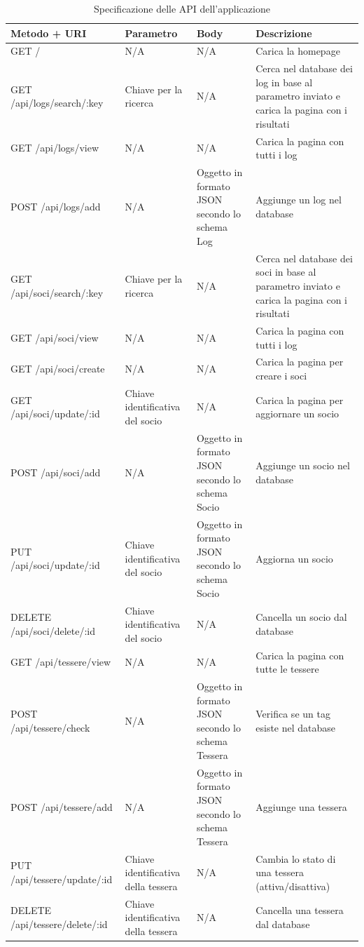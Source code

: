 \documentclass[12pt]{report}
\begin{document}
\vspace*{35px} 
\begin{table}[H]
	\scriptsize
	\centering
	\def\tabularxcolumn#1{m{#1}}
	\renewcommand\arraystretch{1.8}
	\renewcommand\tabcolsep{3.0pt}
	\begin{tabularx}{\textwidth}{|L|L|L|L|}
		\hline
		\textbf{Metodo + URI} & \textbf{Parametro} & \textbf{Body} & \textbf{Descrizione} \\
		\hline                              
		GET / & N/A & N/A & Carica la homepage \\ 
		\hline
		GET /api/logs/search/:key & Chiave per la ricerca & N/A 
		& Cerca nel database dei log in base al parametro inviato e carica la pagina con i risultati \\
		\hline
		GET /api/logs/view & N/A & N/A & Carica la pagina con tutti i log \\
		\hline  
		POST /api/logs/add & N/A & Oggetto in formato JSON secondo lo schema Log & Aggiunge un log nel database \\
		\hline
		GET /api/soci/search/:key & Chiave per la ricerca & N/A & Cerca nel database dei soci in base al parametro inviato e carica la pagina con i risultati \\ 
		\hline
		GET /api/soci/view & N/A & N/A & Carica la pagina con tutti i log \\ 
		\hline
		GET /api/soci/create & N/A & N/A & Carica la pagina per creare i soci \\ 
		\hline
		GET /api/soci/update/:id & Chiave identificativa del socio & N/A & Carica la pagina per aggiornare un socio \\ 
		\hline
		POST /api/soci/add & N/A & Oggetto in formato JSON secondo lo schema Socio & Aggiunge un socio nel database \\ 
		\hline
		PUT /api/soci/update/:id & Chiave identificativa del socio & Oggetto in formato JSON secondo lo schema Socio & Aggiorna un socio \\ 
		\hline
		DELETE /api/soci/delete/:id & Chiave identificativa del socio & N/A & Cancella un socio dal database \\ 
		\hline
		GET /api/tessere/view & N/A & N/A & Carica la pagina con tutte le tessere \\ 
		\hline
		POST /api/tessere/check & N/A & Oggetto in formato JSON secondo lo schema Tessera & Verifica se un tag esiste nel database \\
		\hline
		POST /api/tessere/add & N/A & Oggetto in formato JSON secondo lo schema Tessera & Aggiunge una tessera \\ 
		\hline
		PUT /api/tessere/update/:id & Chiave identificativa della tessera & N/A & Cambia lo stato di una tessera (attiva/disattiva) \\ 
		\hline
		DELETE /api/tessere/delete/:id & Chiave identificativa della tessera & N/A & Cancella una tessera dal database \\ 
		\hline
	\end{tabularx}
	\caption{Specificazione delle API dell'applicazione}
	\label{tab:api}
\end{table}
\end{document}
